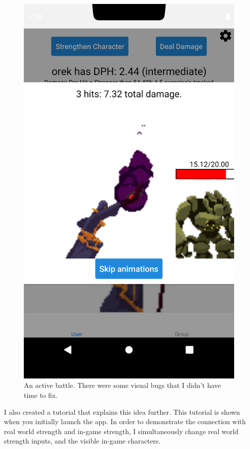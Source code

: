 \documentclass{l4proj}
\begin{document}
\begin{figure}[H]
    \centering
    \includegraphics[width=1.0\linewidth]{attack.png}    
    \caption{
      An active battle. There were some visual bugs that I didn't have time to fix.
    }
\end{figure}

I also created a tutorial that explains this idea further. This tutorial is shown when you initially launch the app. In order to demonstrate the connection with real world strength and in-game strength, I simultaneously change real world strength inputs, and the visible in-game characters.
\end{document}

